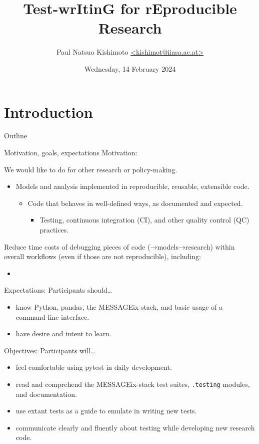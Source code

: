 \documentclass[12pt,aspectratio=169]{beamer}
\title{Test-wrItinG for rEproducible Research \emoji{tiger}}
\institute{IIASA Energy, Climate, and Environment program}
\date{Wednesday, 14 February 2024}
\author{\texorpdfstring{Paul Natsuo Kishimoto \scriptsize\newline
  \href{mailto:kishimot@iiasa.ac.at}%
       {\ttfamily <kishimot@iiasa.ac.at>}}%
  {Paul Natsuo Kishimoto <kishimot@iiasa.ac.at>}}
\renewcommand{\mod}[1]{\texttt{#1}}
\begin{document}
\maketitle

\section{Introduction}
\begin{frame}{Outline}
  \tableofcontents
\end{frame}

\begin{frame}[allowframebreaks]{Motivation, goals, expectations}
Motivation:

\bigskip
We would like to do  for other research or policy-making.
\begin{itemize}
  \item Models and analysis implemented in reproducible, reusable, extensible code.
  \begin{itemize}
    \item Code that behaves in well-defined ways, as documented and expected.
    \begin{itemize}
       \item Testing, continuous integration (CI), and other quality control (QC) practices.
    \end{itemize}
  \end{itemize}
\end{itemize}

\pause
Reduce time costs of debugging pieces of code (→models→research) within overall workflows (even if those are not reproducible), including:
\begin{itemize}
    \item
\end{itemize}

\framebreak
Expectations: Participants should…
\begin{itemize}
  \item know Python, pandas, the MESSAGEix stack, and basic usage of a command-line interface.
  \item have desire and intent to learn.
\end{itemize}

\medskip
Objectives: Participants will…
\begin{itemize}
  \item feel comfortable using pytest in daily development.
  \item read and comprehend the MESSAGEix-stack test suites, \mod{.testing} modules, and documentation.
  \item use extant tests as a guide to emulate in writing new tests.
  \item communicate clearly and fluently about testing while developing new research code.
\end{itemize}
\end{frame}
\end{document}

